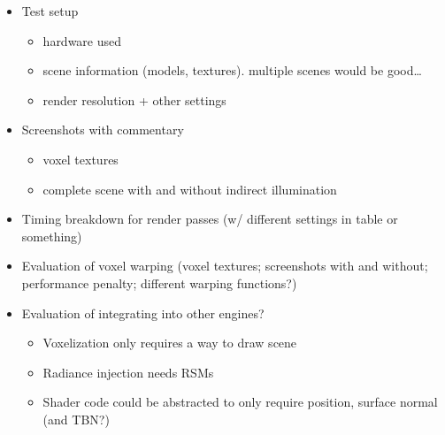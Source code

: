 \begin{itemize}
    \item Test setup
    \begin{itemize}
        \item hardware used
        \item scene information (models, textures). multiple scenes would be good\ldots
        \item render resolution + other settings
    \end{itemize}
    \item Screenshots with commentary
    \begin{itemize}
        \item voxel textures
        \item complete scene with and without indirect illumination
    \end{itemize}
    \item Timing breakdown for render passes (w/ different settings in table or something)
    \item Evaluation of voxel warping (voxel textures; screenshots with and without; performance penalty; different warping functions?)
    \item Evaluation of integrating into other engines?
    \begin{itemize}
        \item Voxelization only requires a way to draw scene
        \item Radiance injection needs RSMs
        \item Shader code could be abstracted to only require position, surface normal (and TBN?)
    \end{itemize}
\end{itemize}

